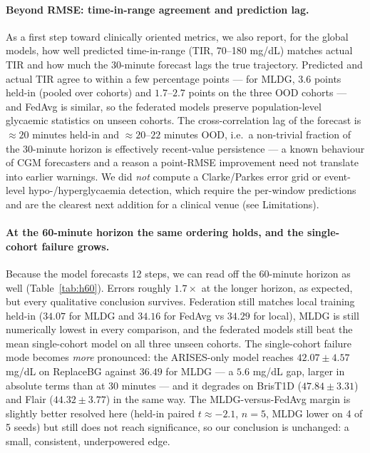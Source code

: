 \documentclass[10pt,letterpaper]{article}
\begin{document}
\paragraph{Beyond RMSE: time-in-range agreement and prediction lag.} As a first
step toward clinically oriented metrics, we also report, for the global models,
how well predicted time-in-range (TIR, 70--180 mg/dL) matches actual TIR and how
much the 30-minute forecast lags the true trajectory. Predicted and actual TIR
agree to within a few percentage points --- for MLDG, $3.6$ points held-in
(pooled over cohorts) and $1.7$--$2.7$ points on the three OOD cohorts --- and
FedAvg is similar, so the federated models preserve population-level glycaemic
statistics on unseen cohorts. The cross-correlation lag of the forecast is
$\approx 20$ minutes held-in and $\approx 20$--$22$ minutes OOD, i.e.\ a
non-trivial fraction of the 30-minute horizon is effectively recent-value
persistence --- a known behaviour of CGM forecasters and a reason a point-RMSE
improvement need not translate into earlier warnings. We did \emph{not} compute a
Clarke/Parkes error grid or event-level hypo-/hyperglycaemia detection, which
require the per-window predictions and are the clearest next addition for a
clinical venue (see Limitations).

\paragraph{At the 60-minute horizon the same ordering holds, and the
single-cohort failure grows.} Because the model forecasts 12 steps, we can read
off the 60-minute horizon as well (Table~\ref{tab:h60}). Errors roughly
$1.7\times$ at the longer horizon, as expected, but every qualitative conclusion
survives. Federation still matches local training held-in ($34.07$ for MLDG and
$34.16$ for FedAvg vs $34.29$ for local), MLDG is still numerically lowest in
every comparison, and the federated models still beat the mean single-cohort model
on all three unseen cohorts. The single-cohort failure mode becomes \emph{more}
pronounced: the ARISES-only model reaches $42.07 \pm 4.57$ mg/dL on ReplaceBG
against $36.49$ for MLDG --- a $5.6$ mg/dL gap, larger in absolute terms than at
30 minutes --- and it degrades on BrisT1D ($47.84 \pm 3.31$) and Flair
($44.32 \pm 3.77$) in the same way. The MLDG-versus-FedAvg margin is slightly
better resolved here (held-in paired $t \approx -2.1$, $n=5$, MLDG lower on 4 of 5
seeds) but still does not reach significance, so our conclusion is unchanged: a
small, consistent, underpowered edge.
\end{document}

